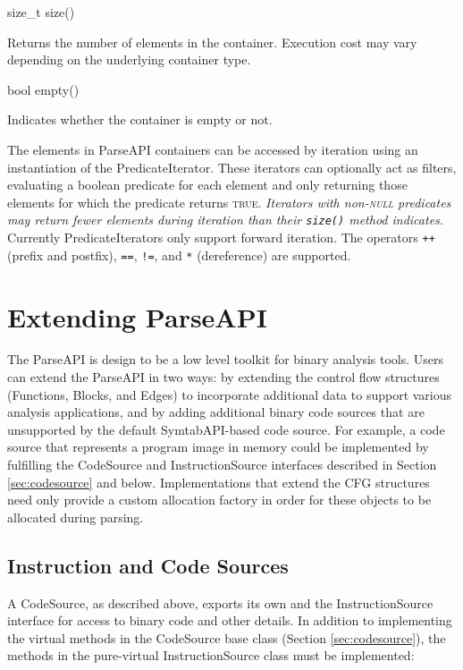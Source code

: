 \documentclass{article}
\newenvironment{apient}{\small\verbatim}{\endverbatim}
\newcommand{\apidesc}[1]{%
{\addtolength{\leftskip}{4em}%
#1\par\medskip}
}
\begin{document}
\begin{apient}
size_t size()
\end{apient}
\apidesc{Returns the number of elements in the container. Execution cost may vary depending on the underlying container type.}

\begin{apient}
bool empty()
\end{apient}
\apidesc{Indicates whether the container is empty or not.}

\noindent
The elements in ParseAPI containers can be accessed by iteration using an instantiation of the PredicateIterator. These iterators can optionally act as filters, evaluating a boolean predicate for each element and only returning those elements for which the predicate returns {\scshape true}. \emph{Iterators with non-{\scshape null} predicates may return fewer elements during iteration than their \texttt{size()} method indicates.} Currently PredicateIterators only support forward iteration. The operators \texttt{++} (prefix and postfix), \texttt{==}, \texttt{!=}, and \texttt{*} (dereference) are supported.


\appendix
\section{Extending ParseAPI}
\label{sec:extend}

The ParseAPI is design to be a low level toolkit for binary analysis tools.
Users can extend the ParseAPI in two ways: by extending the control flow
structures (Functions, Blocks, and Edges) to incorporate additional data to
support various analysis applications, and by adding additional binary code
sources that are unsupported by the default SymtabAPI-based code source. For
example, a code source that represents a program image in memory could be
implemented by fulfilling the CodeSource and InstructionSource interfaces
described in Section \ref{sec:codesource} and below. Implementations that
extend the CFG structures need only provide a custom allocation factory in
order for these objects to be allocated during parsing.

\subsection{Instruction and Code Sources}

A CodeSource, as described above, exports its own and the InstructionSource interface for access to binary code and other details. In addition to implementing the virtual methods in the CodeSource base class (Section \ref{sec:codesource}), the methods in the pure-virtual InstructionSource class must be implemented:
\end{document}
